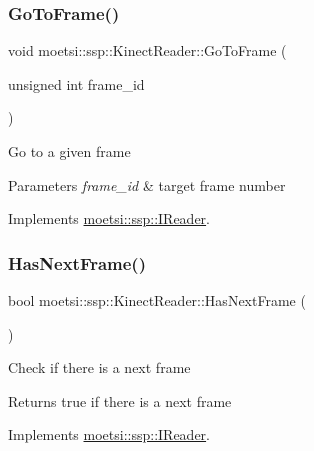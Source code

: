 \subsubsection{\texorpdfstring{Go\+To\+Frame()}{GoToFrame()}}
{\footnotesize\ttfamily void moetsi\+::ssp\+::\+Kinect\+Reader\+::\+Go\+To\+Frame (\begin{DoxyParamCaption}\item[{unsigned int}]{frame\+\_\+id }\end{DoxyParamCaption})\hspace{0.3cm}{\ttfamily [virtual]}}

Go to a given frame 
\begin{DoxyParams}{Parameters}
{\em frame\+\_\+id} & target frame number \\
\hline
\end{DoxyParams}


Implements \hyperlink{classmoetsi_1_1ssp_1_1IReader_a6f1be3c06538992cca6d550bd9566681}{moetsi\+::ssp\+::\+I\+Reader}.

\mbox{\label{classmoetsi_1_1ssp_1_1KinectReader_a08934b6eff437142e482bb21780ca171}} 
\subsubsection{\texorpdfstring{Has\+Next\+Frame()}{HasNextFrame()}}
{\footnotesize\ttfamily bool moetsi\+::ssp\+::\+Kinect\+Reader\+::\+Has\+Next\+Frame (\begin{DoxyParamCaption}{ }\end{DoxyParamCaption})\hspace{0.3cm}{\ttfamily [virtual]}}

Check if there is a next frame \begin{DoxyReturn}{Returns}
true if there is a next frame 
\end{DoxyReturn}


Implements \hyperlink{classmoetsi_1_1ssp_1_1IReader_af9186ba41e136dc4ec3242b5dd55fa04}{moetsi\+::ssp\+::\+I\+Reader}.

\mbox{\label{classmoetsi_1_1ssp_1_1KinectReader_a8495eb28b3893281c1d4bbd5ba9f9739}} 
